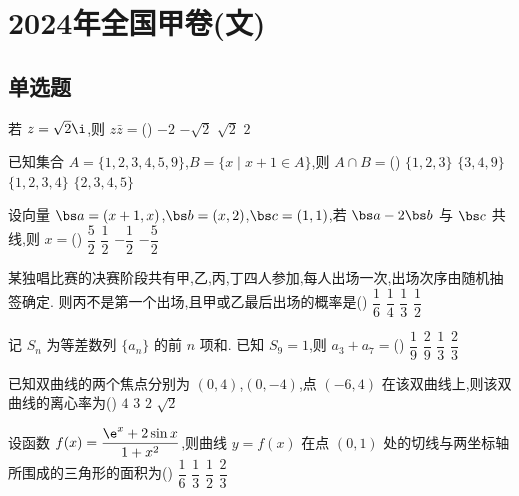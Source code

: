 \chapter{2024年全国甲卷(文)}

\section{单选题}

\begin{problem}
若 \(z=\sqrt{2}\i\),则 \(z\bar z=\)(\quad)
\choices
    {\(-2\)}
    {\(-\sqrt{2}\)}
    {\(\sqrt{2}\)}
    {\(2\)}
\end{problem}

\begin{problem}
已知集合 \(A=\{1,2,3,4,5,9\}\),\(B=\{x\mid x+1\in A\}\),则 \(A\cap B=\)(\quad)
\choices
    {\(\{1,2,3\}\)}
    {\(\{3,4,9\}\)}
    {\(\{1,2,3,4\}\)}
    {\(\{2,3,4,5\}\)}
\end{problem}

\begin{problem}
设向量 \(\bs a=(x+1,x)\),\(\bs b=(x,2)\),\(\bs c=(1,1)\),若 \(\bs a-2\bs b\) 与 \(\bs c\) 共线,则 \(x=\)(\quad)
\choices
    {\(\dfrac52\)}
    {\(\dfrac12\)}
    {\(-\dfrac12\)}
    {\(-\dfrac52\)}
\end{problem}

\begin{problem}
某独唱比赛的决赛阶段共有甲,乙,丙,丁四人参加,每人出场一次,出场次序由随机抽签确定. 则丙不是第一个出场,且甲或乙最后出场的概率是(\quad)
\choices
    {\(\dfrac16\)}
    {\(\dfrac14\)}
    {\(\dfrac13\)}
    {\(\dfrac12\)}
\end{problem}

\begin{problem}
记 \(S_n\) 为等差数列 \(\{a_n\}\) 的前 \(n\) 项和. 已知 \(S_9=1\),则 \(a_3+a_7=\)(\quad)
\choices
    {\(\dfrac19\)}
    {\(\dfrac29\)}
    {\(\dfrac13\)}
    {\(\dfrac23\)}
\end{problem}

\begin{problem}
已知双曲线的两个焦点分别为 \((0,4)\),\((0,-4)\),点 \((-6,4)\) 在该双曲线上,则该双曲线的离心率为(\quad)
\choices
    {\(4\)}
    {\(3\)}
    {\(2\)}
    {\(\sqrt2\)}
\end{problem}

\begin{problem}
设函数 \(f(x)=\dfrac{\e^x+2\sin x}{1+x^2}\),则曲线 \(y=f(x)\) 在点 \((0,1)\) 处的切线与两坐标轴所围成的三角形的面积为(\quad)
\choices
    {\(\dfrac16\)}
    {\(\dfrac13\)}
    {\(\dfrac12\)}
    {\(\dfrac23\)}
\end{problem}

